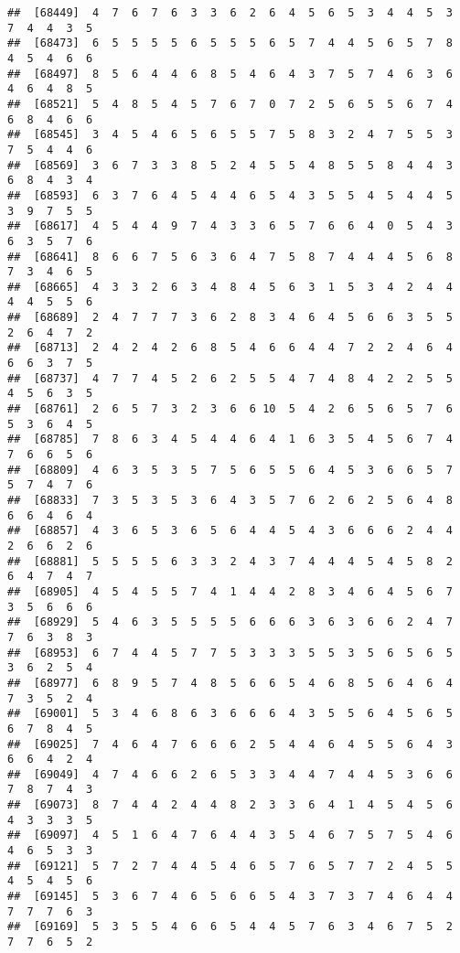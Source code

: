 \documentclass[
]{book}
\begin{document}
\begin{verbatim}
##  [68449]  4  7  6  7  6  3  3  6  2  6  4  5  6  5  3  4  4  5  3  7  4  4  3  5
##  [68473]  6  5  5  5  5  6  5  5  5  6  5  7  4  4  5  6  5  7  8  4  5  4  6  6
##  [68497]  8  5  6  4  4  6  8  5  4  6  4  3  7  5  7  4  6  3  6  4  6  4  8  5
##  [68521]  5  4  8  5  4  5  7  6  7  0  7  2  5  6  5  5  6  7  4  6  8  4  6  6
##  [68545]  3  4  5  4  6  5  6  5  5  7  5  8  3  2  4  7  5  5  3  7  5  4  4  6
##  [68569]  3  6  7  3  3  8  5  2  4  5  5  4  8  5  5  8  4  4  3  6  8  4  3  4
##  [68593]  6  3  7  6  4  5  4  4  6  5  4  3  5  5  4  5  4  4  5  3  9  7  5  5
##  [68617]  4  5  4  4  9  7  4  3  3  6  5  7  6  6  4  0  5  4  3  6  3  5  7  6
##  [68641]  8  6  6  7  5  6  3  6  4  7  5  8  7  4  4  4  5  6  8  7  3  4  6  5
##  [68665]  4  3  3  2  6  3  4  8  4  5  6  3  1  5  3  4  2  4  4  4  4  5  5  6
##  [68689]  2  4  7  7  7  3  6  2  8  3  4  6  4  5  6  6  3  5  5  2  6  4  7  2
##  [68713]  2  4  2  4  2  6  8  5  4  6  6  4  4  7  2  2  4  6  4  6  6  3  7  5
##  [68737]  4  7  7  4  5  2  6  2  5  5  4  7  4  8  4  2  2  5  5  4  5  6  3  5
##  [68761]  2  6  5  7  3  2  3  6  6 10  5  4  2  6  5  6  5  7  6  5  3  6  4  5
##  [68785]  7  8  6  3  4  5  4  4  6  4  1  6  3  5  4  5  6  7  4  7  6  6  5  6
##  [68809]  4  6  3  5  3  5  7  5  6  5  5  6  4  5  3  6  6  5  7  5  7  4  7  6
##  [68833]  7  3  5  3  5  3  6  4  3  5  7  6  2  6  2  5  6  4  8  6  6  4  6  4
##  [68857]  4  3  6  5  3  6  5  6  4  4  5  4  3  6  6  6  2  4  4  2  6  6  2  6
##  [68881]  5  5  5  5  6  3  3  2  4  3  7  4  4  4  5  4  5  8  2  6  4  7  4  7
##  [68905]  4  5  4  5  5  7  4  1  4  4  2  8  3  4  6  4  5  6  7  3  5  6  6  6
##  [68929]  5  4  6  3  5  5  5  5  6  6  6  3  6  3  6  6  2  4  7  7  6  3  8  3
##  [68953]  6  7  4  4  5  7  7  5  3  3  3  5  5  3  5  6  5  6  5  3  6  2  5  4
##  [68977]  6  8  9  5  7  4  8  5  6  6  5  4  6  8  5  6  4  6  4  7  3  5  2  4
##  [69001]  5  3  4  6  8  6  3  6  6  6  4  3  5  5  6  4  5  6  5  6  7  8  4  5
##  [69025]  7  4  6  4  7  6  6  6  2  5  4  4  6  4  5  5  6  4  3  6  6  4  2  4
##  [69049]  4  7  4  6  6  2  6  5  3  3  4  4  7  4  4  5  3  6  6  7  8  7  4  3
##  [69073]  8  7  4  4  2  4  4  8  2  3  3  6  4  1  4  5  4  5  6  4  3  3  3  5
##  [69097]  4  5  1  6  4  7  6  4  4  3  5  4  6  7  5  7  5  4  6  4  6  5  3  3
##  [69121]  5  7  2  7  4  4  5  4  6  5  7  6  5  7  7  2  4  5  5  4  5  4  5  6
##  [69145]  5  3  6  7  4  6  5  6  6  5  4  3  7  3  7  4  6  4  4  7  7  7  6  3
##  [69169]  5  3  5  5  4  6  6  5  4  4  5  7  6  3  4  6  7  5  2  7  7  6  5  2

\end{verbatim}
\end{document}
